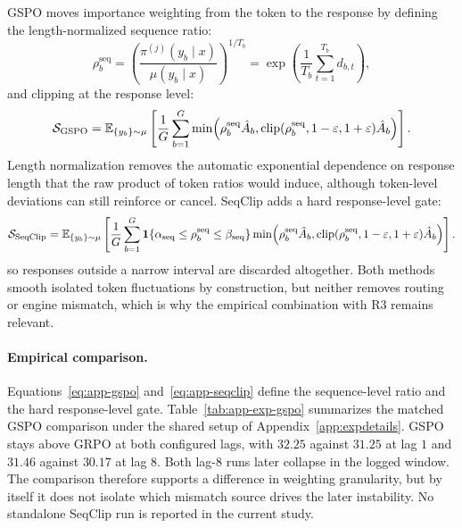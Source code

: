GSPO moves importance weighting from the token to the response by defining the length-normalized sequence ratio:
\begin{equation}
\rho_b^{\mathrm{seq}}
=\left(\frac{\pi^{(j)}(y_b\mid x)}{\mu(y_b\mid x)}\right)^{1/T_b}
=\exp\left(\frac{1}{T_b}\sum_{t=1}^{T_b}d_{b,t}\right),
\label{eq:app-gspo}
\end{equation}
and clipping at the response level:
\begin{equation}
\mathcal S_{\mathrm{GSPO}}
=\mathbb E_{\{y_b\}\sim\mu}
\left[
\frac{1}{G}\sum_{b=1}^{G}
\min\Bigl(\rho_b^{\mathrm{seq}}\hat A_b,
\operatorname{clip}(\rho_b^{\mathrm{seq}},1-\varepsilon,1+\varepsilon)\hat A_b\Bigr)
\right].
\label{eq:app-gspo-loss}
\end{equation}
Length normalization removes the automatic exponential dependence on response length that the raw product of token ratios would induce, although token-level deviations can still reinforce or cancel. SeqClip adds a hard response-level gate:
\begin{equation}
\mathcal S_{\mathrm{SeqClip}}
=\mathbb E_{\{y_b\}\sim\mu}
\left[
\frac{1}{G}\sum_{b=1}^{G}
\mathbf 1\{\alpha_{\mathrm{seq}}\le \rho_b^{\mathrm{seq}}\le \beta_{\mathrm{seq}}\}
\min\Bigl(\rho_b^{\mathrm{seq}}\hat A_b,
\operatorname{clip}(\rho_b^{\mathrm{seq}},1-\varepsilon,1+\varepsilon)\hat A_b\Bigr)
\right].
\label{eq:app-seqclip}
\end{equation}
so responses outside a narrow interval are discarded altogether. Both methods smooth isolated token fluctuations by construction, but neither removes routing or engine mismatch, which is why the empirical combination with R3 remains relevant.

\paragraph{Empirical comparison.}
Equations~\eqref{eq:app-gspo} and~\eqref{eq:app-seqclip} define the sequence-level ratio and the hard response-level gate. Table~\ref{tab:app-exp-gspo} summarizes the matched GSPO comparison under the shared setup of Appendix~\ref{app:expdetails}. GSPO stays above GRPO at both configured lags, with $32.25$ against $31.25$ at lag $1$ and $31.46$ against $30.17$ at lag $8$. Both lag-$8$ runs later collapse in the logged window. The comparison therefore supports a difference in weighting granularity, but by itself it does not isolate which mismatch source drives the later instability. No standalone SeqClip run is reported in the current study.

